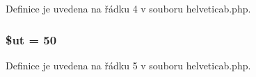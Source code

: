 Definice je uvedena na řádku 4 v souboru helveticab.\-php.

\hypertarget{helveticab_8php_aadd3f841051043ee58e587e840e8dd0b}{
\subsubsection[{\$ut}]{\setlength{\rightskip}{0pt plus 5cm}\$ut = 50}}\label{helveticab_8php_aadd3f841051043ee58e587e840e8dd0b}


Definice je uvedena na řádku 5 v souboru helveticab.\-php.

